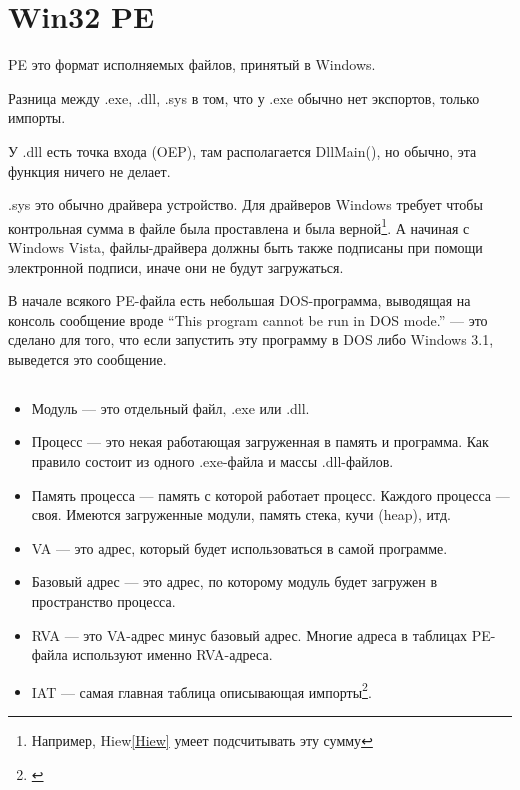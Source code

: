 \section{Win32 PE}

\acs{PE} это формат исполняемых файлов, принятый в Windows.

Разница между .exe, .dll, .sys в том, что у .exe обычно нет экспортов, только импорты.

У .dll есть точка входа (\ac{OEP}), там располагается DllMain(), но обычно, эта
функция ничего не делает.

.sys это обычно драйвера устройство. Для драйверов Windows требует чтобы контрольная сумма в файле была проставлена
и была верной\footnote{Например, Hiew\ref{Hiew} умеет подсчитывать эту сумму}.
А начиная с Windows Vista, файлы-драйвера должны быть также подписаны при помощи электронной подписи, 
иначе они не будут загружаться.

В начале всякого PE-файла есть небольшая DOS-программа, выводящая на консоль сообщение вроде ``This program cannot be run in DOS mode.'' --- 
это сделано для того, что если запустить эту программу в DOS либо Windows 3.1, выведется это сообщение.

\subsection{}

\begin{itemize}
\item
Модуль --- это отдельный файл, .exe или .dll.

\item
Процесс --- это некая работающая загруженная в память и программа. Как правило состоит из одного .exe-файла и массы
.dll-файлов.

\item
Память процесса --- память с которой работает процесс. Каждого процесса --- своя. Имеются загруженные модули, память
стека, кучи (heap), итд.

\item
\ac{VA} --- это адрес, который будет использоваться в самой программе.

\item
Базовый адрес --- это адрес, по которому модуль будет загружен в пространство процесса.

\item
\ac{RVA} --- это VA-адрес минус базовый адрес. Многие адреса в таблицах PE-файла используют именно \ac{RVA}-адреса.

\item
\ac{IAT} --- самая главная таблица описывающая импорты\footnote{\cite{Pietrek1}}.
\end{itemize}

